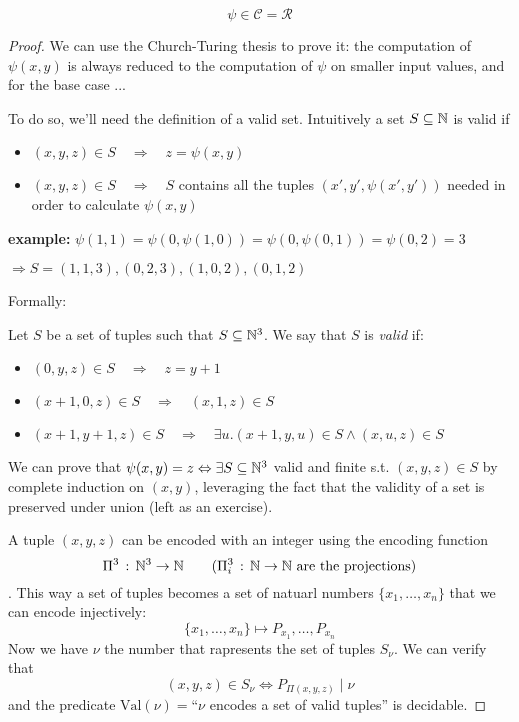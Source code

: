 \begin{theorem}
  \[\psi \in \mathcal{C} = \mathcal{R}\]
  \begin{proof}
    We can use the Church-Turing thesis to prove it: the computation
    of $\psi(x,y)$ is always reduced to the computation of $\psi$ on
    smaller input values, and for the base case ...

    To do so, we'll need the definition of a valid set. Intuitively a
    set $S \subseteq \mathbb{N}$ is valid if

    \begin{itemize}
    \item \((x,y,z) \in S \quad \Rightarrow \quad z = \psi(x,y)\)
    \item \((x,y,z) \in S \quad \Rightarrow \quad S\) contains all the
      tuples \((x', y', \psi(x',y'))\) needed in order to calculate
      $\psi(x,y)$
    \end{itemize}

    \textbf{example:}
    $\psi(1,1) = \psi(0,\psi(1,0)) = \psi(0,\psi(0,1)) = \psi(0,2) = 3$

    $\Rightarrow S = {(1,1,3), (0,2,3), (1,0,2), (0,1,2)}$

    Formally:

    \begin{definition}
      Let $S$ be a set of tuples such that $S \subseteq \mathbb{N}^3$. We say
      that $S$ is \emph{valid} if:
      \begin{itemize}
      \item \((0,y,z) \in S \quad \Rightarrow \quad z = y+1\)
      \item \((x+1,0,z) \in S \quad \Rightarrow \quad (x,1,z) \in S\)
      \item
        \((x+1,y+1,z) \in S \quad \Rightarrow \quad \exists u . (x+1,
        y, u) \in S \wedge (x,u,z) \in S \)
      \end{itemize}
    \end{definition}

    We can prove that
    \(\psi(x,y) = z \Leftrightarrow \exists S \subseteq \mathbb{N}^3\) valid
    and finite s.t. \((x,y,z) \in S\) by complete induction on
    $(x,y)$, leveraging the fact that the validity of a set is
    preserved under union (left as an exercise).

    \newcommand{\vnu}{\text{Val}(\nu)}

    A tuple $(x,y,z)$ can be encoded with an integer using the
    encoding function
    \[\Pi^3 \, : \, \mathbb{N}^3 \rightarrow \mathbb{N} \quad \quad (\Pi_i^3 \, : \,
      \mathbb{N} \rightarrow \mathbb{N} \text{ are the projections})\]. This way a
    set of tuples becomes a set of natuarl numbers
    $\{x_1, \dots, x_n\}$ that we can encode injectively:
    \[\{x_1, \dots, x_n\} \mapsto P_{x_1}, \dots, P_{x_n}\] Now we
    have $\nu$ the number that rapresents the set of tuples
    $S_\nu$. We can verify that
    \[(x,y,z) \in S_\nu \Longleftrightarrow P_{\Pi(x,y,z)} \; | \;
      \nu \] and the predicate $\vnu=$``$\nu$ encodes a
    set of valid tuples'' is decidable.


\end{proof}
\end{theorem}
